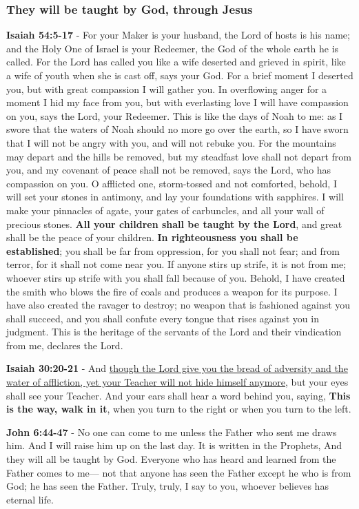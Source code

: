 \documentclass[11pt]{article}
\begin{document}
\subsubsection{They will be taught by God, through Jesus}
\label{sec:orgcd5af26}
\textbf{Isaiah 54:5-17} - For your Maker is your husband, the Lord of hosts is his name; and the Holy One of Israel is your Redeemer, the God of the whole earth he is called. For the Lord has called you like a wife deserted and grieved in spirit, like a wife of youth when she is cast off, says your God. For a brief moment I deserted you, but with great compassion I will gather you. In overflowing anger for a moment I hid my face from you, but with everlasting love I will have compassion on you, says the Lord, your Redeemer. This is like the days of Noah to me: as I swore that the waters of Noah should no more go over the earth, so I have sworn that I will not be angry with you, and will not rebuke you. For the mountains may depart and the hills be removed, but my steadfast love shall not depart from you, and my covenant of peace shall not be removed, says the Lord, who has compassion on you. O afflicted one, storm-tossed and not comforted, behold, I will set your stones in antimony, and lay your foundations with sapphires. I will make your pinnacles of agate, your gates of carbuncles, and all your wall of precious stones. \textbf{All your children shall be taught by the Lord}, and great shall be the peace of your children. \textbf{In righteousness you shall be established}; you shall be far from oppression, for you shall not fear; and from terror, for it shall not come near you. If anyone stirs up strife, it is not from me; whoever stirs up strife with you shall fall because of you. Behold, I have created the smith who blows the fire of coals and produces a weapon for its purpose. I have also created the ravager to destroy; no weapon that is fashioned against you shall succeed, and you shall confute every tongue that rises against you in judgment. This is the heritage of the servants of the Lord and their vindication from me, declares the Lord.

\textbf{Isaiah 30:20-21} - And \uline{though the Lord give you the bread of adversity and the water of affliction, yet your Teacher will not hide himself anymore}, but your eyes shall see your Teacher. And your ears shall hear a word behind you, saying, \textbf{This is the way, walk in it}, when you turn to the right or when you turn to the left.

\textbf{John 6:44-47} - No one can come to me unless the Father who sent me draws him. And I will raise him up on the last day. It is written in the Prophets, And they will all be taught by God. Everyone who has heard and learned from the Father comes to me— not that anyone has seen the Father except he who is from God; he has seen the Father. Truly, truly, I say to you, whoever believes has eternal life.
\end{document}
